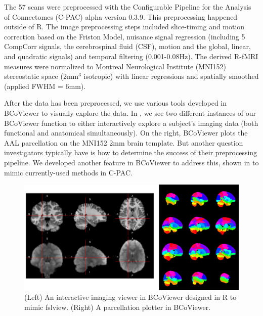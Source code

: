 \documentclass{nature}
\begin{document}
The 57 scans were preprocessed with the Configurable Pipeline for the Analysis
of Connectomes (C-PAC) alpha version 0.3.9. This preprocessing 
happened outside of R. The image preprocessing steps
included slice-timing and motion correction based on the Friston Model, nuisance signal
regression (including 5 CompCorr signals, the cerebrospinal fluid (CSF), motion
 and the global, linear, and quadratic
signals) and temporal filtering (0.001-0.08Hz). The derived R-fMRI measures
were normalized to Montreal Neurological Institute (MNI152) stereostatic
space (2mm$^3$ isotropic) with linear regressions and spatially smoothed
(applied FWHM = 6mm). 

After the data has been preprocessed, we use various tools developed in BCoViewer
to visually explore the data. In , we see two different instances
of our BCoViewer function to either interactively explore a subject's imaging data (both
functional and anatomical simultaneously). On the right, BCoViewer plots the AAL parcellation
on the MNI152 2mm brain template. But another question investigators typically have is 
how to determine the success of their preprocessing pipeline. We developed another feature
in BCoViewer to address this, shown in  to mimic currently-used methods
in C-PAC.


\begin{figure}[tb]
\centering
\includegraphics[width=400pt]{fig/brainconductor/BCoViewer.png}
\caption{(Left) An interactive imaging viewer in BCoViewer designed in R to mimic fslview. (Right) A parcellation plotter in BCoViewer.}
\label{fig:features}
\end{figure}
\end{document}
